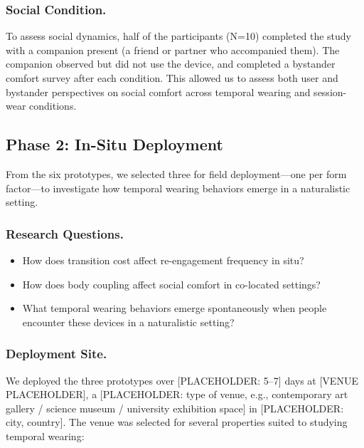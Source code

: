 \subsubsection{Social Condition.}
To assess social dynamics, half of the participants (N=10) completed the study with a companion present (a friend or partner who accompanied them). The companion observed but did not use the device, and completed a bystander comfort survey after each condition. This allowed us to assess both user and bystander perspectives on social comfort across temporal wearing and session-wear conditions.

\subsection{Phase 2: In-Situ Deployment}

From the six prototypes, we selected three for field deployment---one per form factor---to investigate how temporal wearing behaviors emerge in a naturalistic setting.

\subsubsection{Research Questions.}
\begin{itemize}
    \item[\textbf{RQ1}] How does transition cost affect re-engagement frequency in situ?
    \item[\textbf{RQ2}] How does body coupling affect social comfort in co-located settings?
    \item[\textbf{RQ3}] What temporal wearing behaviors emerge spontaneously when people encounter these devices in a naturalistic setting?
\end{itemize}

\subsubsection{Deployment Site.}
We deployed the three prototypes over [PLACEHOLDER: 5--7] days at [VENUE PLACEHOLDER], a [PLACEHOLDER: type of venue, e.g., contemporary art gallery / science museum / university exhibition space] in [PLACEHOLDER: city, country]. The venue was selected for several properties suited to studying temporal wearing:

